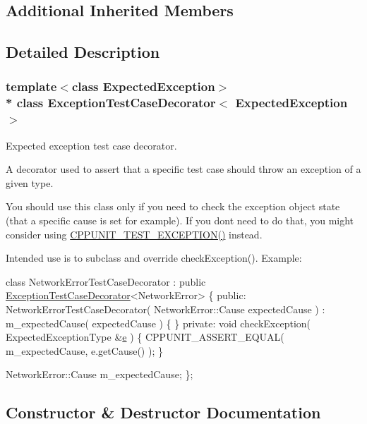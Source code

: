 \subsection*{Additional Inherited Members}


\subsection{Detailed Description}
\subsubsection*{template$<$class Expected\+Exception$>$\\*
class Exception\+Test\+Case\+Decorator$<$ Expected\+Exception $>$}

Expected exception test case decorator. 

A decorator used to assert that a specific test case should throw an exception of a given type.

You should use this class only if you need to check the exception object state (that a specific cause is set for example). If you don\textquotesingle{}t need to do that, you might consider using \hyperlink{group___writing_test_fixture_ga0d51339f412270aee9a2d6c015d80ef2}{C\+P\+P\+U\+N\+I\+T\+\_\+\+T\+E\+S\+T\+\_\+\+E\+X\+C\+E\+P\+T\+I\+O\+N()} instead.

Intended use is to subclass and override check\+Exception(). Example\+:


\begin{DoxyCode}
\textcolor{keyword}{class }NetworkErrorTestCaseDecorator : 
          \textcolor{keyword}{public} \hyperlink{class_exception_test_case_decorator}{ExceptionTestCaseDecorator}<NetworkError>
\{
\textcolor{keyword}{public}:
  NetworkErrorTestCaseDecorator( NetworkError::Cause expectedCause )
      : m\_expectedCause( expectedCause )
  \{
  \}
\textcolor{keyword}{private}:
  \textcolor{keywordtype}{void} checkException( ExpectedExceptionType &\hyperlink{group__gtc__constants_gab83fb6de0f05d6c0d11bdf0479f8319e}{e} )
  \{
    CPPUNIT\_ASSERT\_EQUAL( m\_expectedCause, e.getCause() );
  \}

  NetworkError::Cause m\_expectedCause;
\};
\end{DoxyCode}
 

\subsection{Constructor \& Destructor Documentation}
